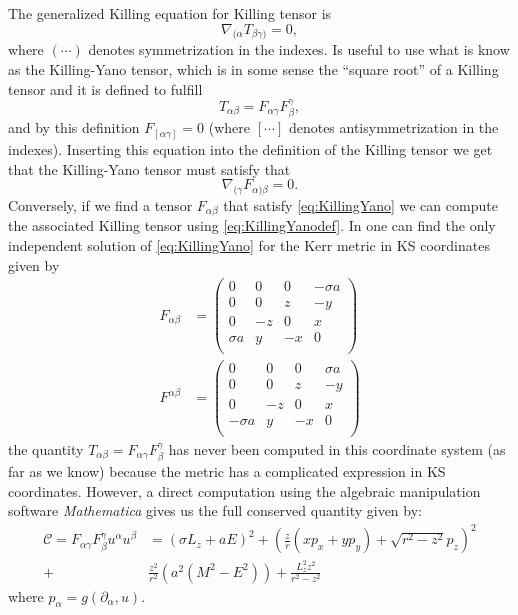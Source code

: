 \begin{Proof}
The generalized Killing equation for Killing tensor is
\begin{equation}
\nabla_{(\alpha} T_{\beta \gamma )} = 0,
\end{equation}
where $(\cdots)$ denotes symmetrization in the indexes. Is useful to use what is know as the Killing-Yano tensor, which is in some sense the ``square root'' of a Killing tensor and it is defined to fulfill
\begin{equation}\label{eq:KillingYanodef}
 T_{\alpha \beta}= F_{\alpha \gamma}F_{\beta}^\gamma,
\end{equation}
and by this definition $F_{[\alpha \gamma]}=0$ (where $[\cdots]$ denotes antisymmetrization in the indexes). Inserting this equation into the definition of the Killing tensor we get that the Killing-Yano tensor must satisfy that
\begin{equation}\label{eq:KillingYano}
 \nabla_{(\gamma} F_{\alpha) \beta} =0.
\end{equation}
Conversely, if we find a tensor $F_{\alpha \beta}$ that satisfy \cref{eq:KillingYano} we can compute the associated Killing tensor using \cref{eq:KillingYanodef}. In \cite{faridi1986precession} one can find the only independent solution of \cref{eq:KillingYano} for the Kerr metric in \gls{KS} coordinates given by
\begin{align}
 F_{\alpha \beta}&=\left(
\begin{array}{cccc}
 0 & 0 & 0 & - \sigma a \\
 0 & 0 & z & -y \\
 0 & -z & 0 & x \\
 \sigma a & y & -x & 0 \\
\end{array}
\right)\\
F^{\alpha \beta}&=\left(
\begin{array}{cccc}
 0 & 0 & 0 & \sigma a \\
 0 & 0 & z & -y \\
 0 & -z & 0 & x \\
 -\sigma a & y & -x & 0 \\
\end{array}
\right)
\end{align}
the quantity $T_{\alpha \beta}= F_{\alpha \gamma}F_{\beta}^\gamma$ has never been computed in this coordinate system (as far as we know) because the metric has a complicated expression in \gls{KS} coordinates. However, a direct computation using the algebraic manipulation software \textit{Mathematica} gives us the full conserved quantity given by:
\begin{equation}
\begin{aligned}
 \mathcal{C}=F_{\alpha \gamma}F_{\beta}^\gamma u^\alpha u^\beta &= (\sigma L_z+a E)^2 + \left( \frac{z}{r}(x p_x +y p_y)+\sqrt{r^2-z^2} p_z \right)^2 \\
 +&\frac{z^2}{r^2} \left( a^2(M^2-E^2) \right)+ \frac{L_z^2 z^2}{r^2-z^2} 
\end{aligned}
\end{equation}
where $p_\alpha =g(\partial_\alpha,u)$.\end{Proof}


